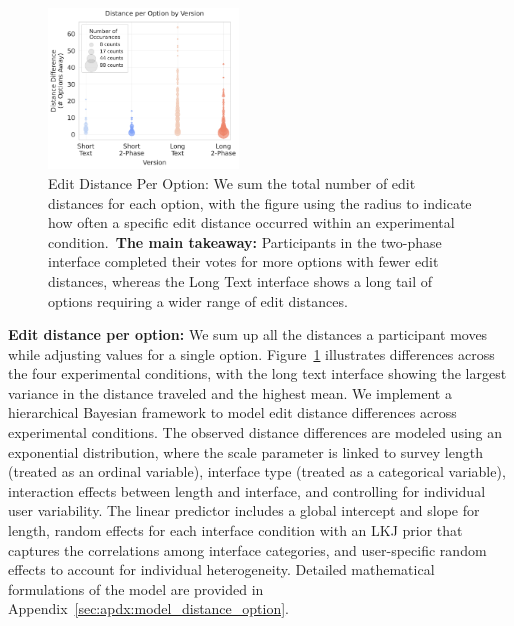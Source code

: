 \begin{figure}[ht]
    \centering
    \includegraphics[width=0.45\textwidth]{content/image/distance/distance_diff_by_version.pdf}
    \caption{Edit Distance Per Option: We sum the total number of edit distances for each option, with the figure using the radius to indicate how often a specific edit distance occurred within an experimental condition.~\textbf{The main takeaway:} Participants in the two-phase interface completed their votes for more options with fewer edit distances, whereas the Long Text interface shows a long tail of options requiring a wider range of edit distances.}
    \label{fig:dist_per_option}
\end{figure}

\textbf{Edit distance per option:} We sum up all the distances a participant moves while adjusting values for a single option. Figure~\ref{fig:dist_per_option} illustrates differences across the four experimental conditions, with the long text interface showing the largest variance in the distance traveled and the highest mean. We implement a hierarchical Bayesian framework to model edit distance differences across experimental conditions. The observed distance differences are modeled using an exponential distribution, where the scale parameter is linked to survey length (treated as an ordinal variable), interface type (treated as a categorical variable), interaction effects between length and interface, and controlling for individual user variability. The linear predictor includes a global intercept and slope for length, random effects for each interface condition with an LKJ prior that captures the correlations among interface categories, and user-specific random effects to account for individual heterogeneity. Detailed mathematical formulations of the model are provided in Appendix~\ref{sec:apdx:model_distance_option}. 

